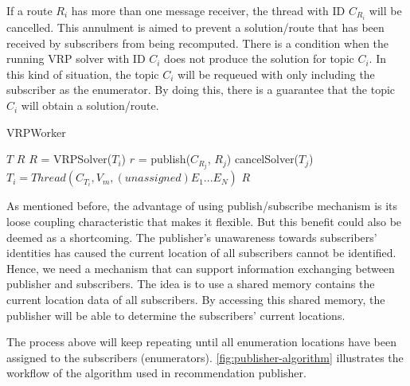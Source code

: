 \documentclass[conference]{IEEEtran}
\begin{document}
If a route $R_i$ has more than one message receiver, the thread with ID $C_{R_i}$ will be cancelled. This annulment is aimed to prevent a solution/route that has been received by subscribers from being recomputed. There is a condition when the running VRP solver with ID $C_i$ does not produce the solution for topic $C_i$. In this kind of situation, the topic $C_i$ will be requeued with only including the subscriber as the enumerator. By doing this, there is a guarantee that the topic $C_i$  will obtain a solution/route. 


\begin{algorithm}[h]
	\caption{VRPWorker}
	\label{alg:vrp-worker}
	\begin{algorithmic}[1]
		\renewcommand{\algorithmicrequire}{\textbf{Input:}}
		\renewcommand{\algorithmicensure}{\textbf{Output:}}
		\REQUIRE $T$
		\ENSURE  $R$
			\STATE $R$ = VRPSolver($T_i$)
				\STATE $r$ = publish($C_{R_j}$, $R_j$)
					\STATE cancelSolver($T_j$)
					\STATE $T_i = Thread(C_{T_i}, V_m, (unassigned) E_1...E_N)$
				\ENDIF
			\ENDFOR
		\ENDFOR
		\RETURN $R$
	\end{algorithmic}
\end{algorithm}


As mentioned before, the advantage of using publish/subscribe mechanism is its loose coupling characteristic that makes it flexible. But this benefit could also be deemed as a shortcoming. The publisher's unawareness towards subscribers' identities has caused the current location of all subscribers cannot be identified. Hence, we need a mechanism that can support information exchanging between publisher and subscribers. The idea is to use a shared memory contains the current location data of all subscribers. By accessing this shared memory, the publisher will be able to determine the subscribers' current locations. 


The process above will keep repeating until all enumeration locations have been assigned to the subscribers (enumerators). \autoref{fig:publisher-algorithm} illustrates the workflow of the algorithm used in recommendation publisher.
\end{document}
